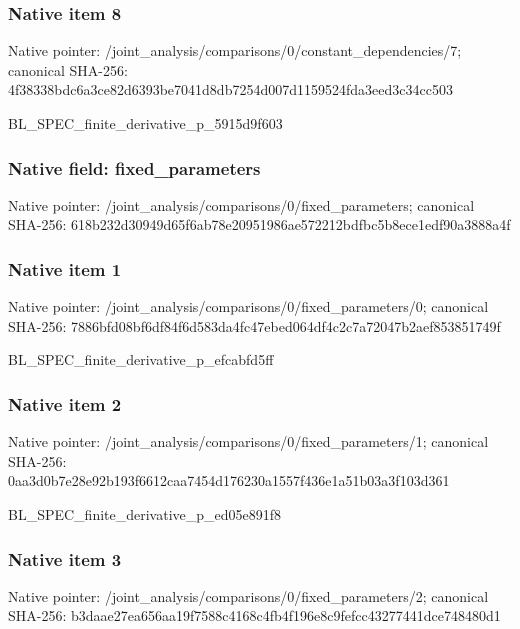 \documentclass[10pt,a4paper]{article}
\begin{document}
\subsubsection{Native item 8}
Native pointer: /joint\_\allowbreak{}analysis/comparisons/0/constant\_\allowbreak{}dependencies/7; canonical SHA-256: 4f38338bdc6a3ce82d6393be7041d8db7254d007d1159524fda3eed3c34cc503

\begingroup\raggedright\sloppy BL\_\allowbreak{}SPEC\_\allowbreak{}finite\_\allowbreak{}derivative\_\allowbreak{}p\_\allowbreak{}5915d9f603\par\endgroup

\subsubsection{Native field: fixed\_\allowbreak{}parameters}
Native pointer: /joint\_\allowbreak{}analysis/comparisons/0/fixed\_\allowbreak{}parameters; canonical SHA-256: 618b232d30949d65f6ab78e20951986ae572212bdfbc5b8ece1edf90a3888a4f

\subsubsection{Native item 1}
Native pointer: /joint\_\allowbreak{}analysis/comparisons/0/fixed\_\allowbreak{}parameters/0; canonical SHA-256: 7886bfd08bf6df84f6d583da4fc47ebed064df4c2c7a72047b2aef853851749f

\begingroup\raggedright\sloppy BL\_\allowbreak{}SPEC\_\allowbreak{}finite\_\allowbreak{}derivative\_\allowbreak{}p\_\allowbreak{}efcabfd5ff\par\endgroup

\subsubsection{Native item 2}
Native pointer: /joint\_\allowbreak{}analysis/comparisons/0/fixed\_\allowbreak{}parameters/1; canonical SHA-256: 0aa3d0b7e28e92b193f6612caa7454d176230a1557f436e1a51b03a3f103d361

\begingroup\raggedright\sloppy BL\_\allowbreak{}SPEC\_\allowbreak{}finite\_\allowbreak{}derivative\_\allowbreak{}p\_\allowbreak{}ed05e891f8\par\endgroup

\subsubsection{Native item 3}
Native pointer: /joint\_\allowbreak{}analysis/comparisons/0/fixed\_\allowbreak{}parameters/2; canonical SHA-256: b3daae27ea656aa19f7588c4168c4fb4f196e8c9fefcc43277441dce748480d1
\end{document}
